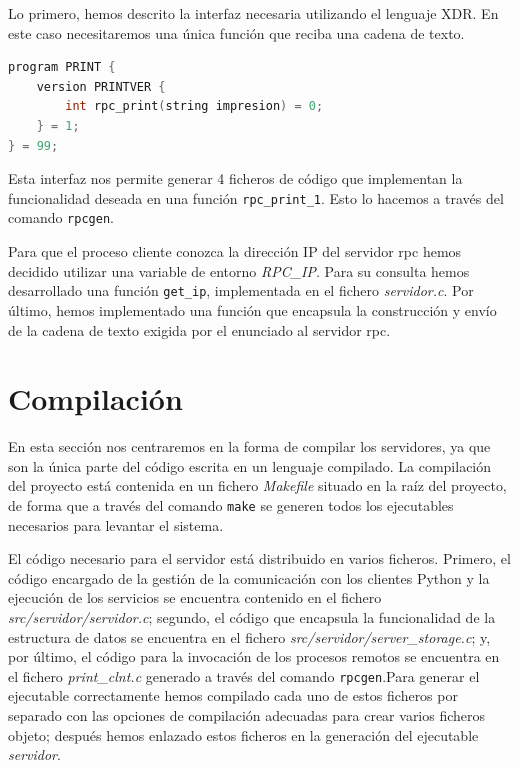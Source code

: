 \documentclass[]{article}
\begin{document}
Lo primero, hemos descrito la interfaz necesaria utilizando el lenguaje XDR. En este caso necesitaremos una única función que reciba una cadena de texto. 

\begin{lstlisting}[language=C, caption=Interfaz XDR]
program PRINT {
    version PRINTVER {
        int rpc_print(string impresion) = 0;
    } = 1;
} = 99;
\end{lstlisting}

Esta interfaz nos permite generar 4 ficheros de código que implementan la funcionalidad deseada en una función \texttt{rpc\_print\_1}. Esto lo hacemos a través del comando \texttt{rpcgen}.

Para que el proceso cliente conozca la dirección IP del servidor rpc hemos decidido utilizar una variable de entorno \textit{RPC\_IP}. Para su consulta hemos desarrollado una función \texttt{get\_ip}, implementada en el fichero \textit{servidor.c}. Por último, hemos implementado una función que encapsula la construcción y envío de la cadena de texto exigida por el enunciado al servidor rpc. 

\section{Compilación}
\label{sec:compilacion}
En esta sección nos centraremos en la forma de compilar los servidores, ya que son la única parte del código escrita en un lenguaje compilado. La compilación del proyecto está contenida en un fichero \textit{Makefile} situado en la raíz del proyecto, de forma que a través del comando \texttt{make} se generen todos los ejecutables necesarios para levantar el sistema.  

El código necesario para el servidor está distribuido en varios ficheros. Primero, el código encargado de la gestión de la comunicación con los clientes Python y la ejecución de los servicios se encuentra contenido en el fichero \textit{src/servidor/servidor.c}; segundo, el código que encapsula la funcionalidad de la estructura de datos se encuentra en el fichero \textit{src/servidor/server\_storage.c}; y, por último, el código para la invocación de los procesos remotos se encuentra en el fichero \textit{print\_clnt.c} generado a través del comando \texttt{rpcgen}.Para generar el ejecutable correctamente hemos compilado cada uno de estos ficheros por separado con las opciones de compilación adecuadas para crear varios ficheros objeto; después hemos enlazado estos ficheros en la generación del ejecutable \textit{servidor}.
\end{document}
